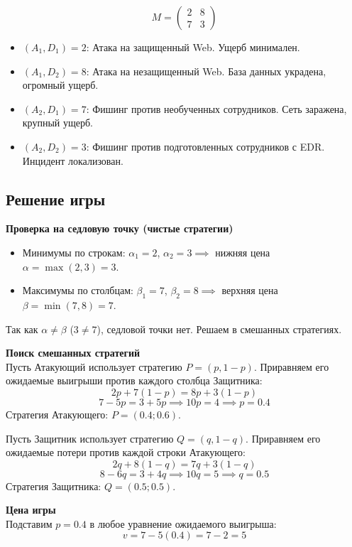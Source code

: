 \documentclass[a4paper,12pt]{article}
\begin{document}
$$ M = \begin{pmatrix} 2 & 8 \\ 7 & 3 \end{pmatrix} $$

\begin{itemize}
    \item $(A_1, D_1) = 2$: Атака на защищенный Web. Ущерб минимален.
    \item $(A_1, D_2) = 8$: Атака на незащищенный Web. База данных украдена, огромный ущерб.
    \item $(A_2, D_1) = 7$: Фишинг против необученных сотрудников. Сеть заражена, крупный ущерб.
    \item $(A_2, D_2) = 3$: Фишинг против подготовленных сотрудников с EDR. Инцидент локализован.
\end{itemize}

\subsection*{Решение игры}

\textbf{Проверка на седловую точку (чистые стратегии)}
\begin{itemize}
    \item Минимумы по строкам: $\alpha_1 = 2$, $\alpha_2 = 3 \implies$ нижняя цена $\alpha = \max(2, 3) = 3$.
    \item Максимумы по столбцам: $\beta_1 = 7$, $\beta_2 = 8 \implies$ верхняя цена $\beta = \min(7, 8) = 7$.
\end{itemize}
Так как $\alpha \neq \beta$ ($3 \neq 7$), седловой точки нет. Решаем в смешанных стратегиях.

\vspace{0.3cm}
\textbf{Поиск смешанных стратегий}\\
Пусть Атакующий использует стратегию $P = (p, 1-p)$. Приравняем его ожидаемые выигрыши против каждого столбца Защитника:
$$ 2p + 7(1-p) = 8p + 3(1-p) $$
$$ 7 - 5p = 3 + 5p \implies 10p = 4 \implies p = 0.4 $$
Стратегия Атакующего: $P = (0.4; 0.6)$.

\vspace{0.3cm}
Пусть Защитник использует стратегию $Q = (q, 1-q)$. Приравняем его ожидаемые потери против каждой строки Атакующего:
$$ 2q + 8(1-q) = 7q + 3(1-q) $$
$$ 8 - 6q = 3 + 4q \implies 10q = 5 \implies q = 0.5 $$
Стратегия Защитника: $Q = (0.5; 0.5)$.

\vspace{0.3cm}
\textbf{Цена игры}\\
Подставим $p = 0.4$ в любое уравнение ожидаемого выигрыша:
$$ v = 7 - 5(0.4) = 7 - 2 = 5 $$
\end{document}
